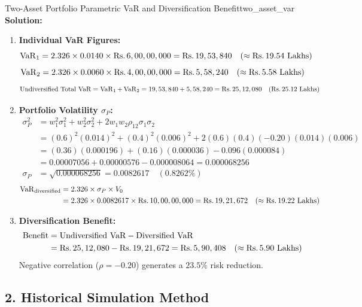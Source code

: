 \begin{example}{Two-Asset Portfolio Parametric VaR and Diversification Benefit}{two_asset_var}
\textbf{Solution:}
\begin{enumerate}[leftmargin=1.2em, itemsep=2pt]
    \item \textbf{Individual VaR Figures:}
    \[
    \operatorname{VaR}_{1} = 2.326 \times 0.0140 \times \text{Rs.}\, 6,00,00,000 = \text{Rs.}\, 19,53,840 \quad (\approx \text{Rs.}\, 19.54 \text{ Lakhs})
    \]
    \[
    \operatorname{VaR}_{2} = 2.326 \times 0.0060 \times \text{Rs.}\, 4,00,00,000 = \text{Rs.}\, 5,58,240 \quad (\approx \text{Rs.}\, 5.58 \text{ Lakhs})
    \]
    \[
    \text{Undiversified Total VaR} = \operatorname{VaR}_1 + \operatorname{VaR}_2 = 19,53,840 + 5,58,240 = \text{Rs.}\, 25,12,080 \quad (\text{Rs.}\, 25.12 \text{ Lakhs})
    \]
    \item \textbf{Portfolio Volatility $\sigma_P$:}
    \begin{align*}
    \sigma_P^2 &= w_1^2 \sigma_1^2 + w_2^2 \sigma_2^2 + 2 w_1 w_2 \rho_{12} \sigma_1 \sigma_2 \\
    &= (0.6)^2(0.014)^2 + (0.4)^2(0.006)^2 + 2(0.6)(0.4)(-0.20)(0.014)(0.006) \\
    &= (0.36)(0.000196) + (0.16)(0.000036) - 0.096(0.000084) \\
    &= 0.00007056 + 0.00000576 - 0.000008064 = 0.000068256 \\
    \sigma_P &= \sqrt{0.000068256} = 0.0082617 \quad (0.8262\%)
    \end{align*}
    \begin{align*}
    \operatorname{VaR}_{\text{diversified}} &= 2.326 \times \sigma_P \times V_0 \\
    &= 2.326 \times 0.0082617 \times \text{Rs.}\, 10,00,00,000 = \text{Rs.}\, 19,21,672 \quad (\approx \text{Rs.}\, 19.22 \text{ Lakhs})
    \end{align*}
    \item \textbf{Diversification Benefit:}
    \begin{align*}
    \text{Benefit} &= \text{Undiversified VaR} - \text{Diversified VaR} \\
    &= \text{Rs.}\, 25,12,080 - \text{Rs.}\, 19,21,672 = \text{Rs.}\, 5,90,408 \quad (\approx \text{Rs.}\, 5.90 \text{ Lakhs})
    \end{align*}
    Negative correlation ($\rho = -0.20$) generates a $23.5\%$ risk reduction.
\end{enumerate}
\end{example}

\subsection{2. Historical Simulation Method}

